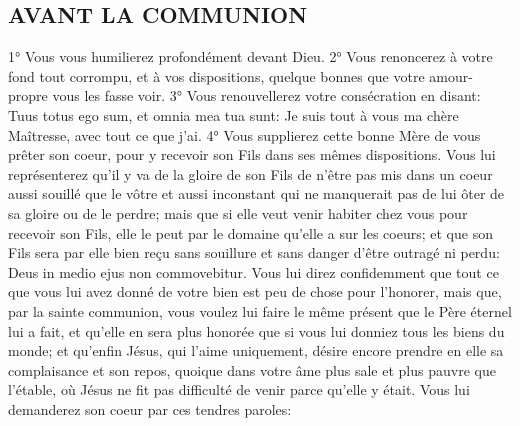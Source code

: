 \subsection{AVANT LA COMMUNION}
 1° Vous vous humilierez profondément devant Dieu. 2° Vous renoncerez à votre fond tout corrompu, et à vos
dispositions, quelque bonnes que votre amour-propre vous les fasse voir. 3° Vous renouvellerez votre
consécration en disant: Tuus totus ego sum, et omnia mea tua sunt: Je suis tout à vous ma chère Maîtresse, avec
tout ce que j'ai. 4° Vous supplierez cette bonne Mère de vous prêter son coeur, pour y recevoir son Fils dans ses
mêmes dispositions. Vous lui représenterez qu'il y va de la gloire de son Fils de n'être pas mis dans un coeur aussi
souillé que le vôtre et aussi inconstant qui ne manquerait pas de lui ôter de sa gloire ou de le perdre; mais que si
elle veut venir habiter chez vous pour recevoir son Fils, elle le peut par le domaine qu'elle a sur les coeurs; et que
son Fils sera par elle bien reçu sans souillure et sans danger d'être outragé ni perdu: Deus in medio ejus non
commovebitur. Vous lui direz confidemment que tout ce que vous lui avez donné de votre bien est peu de chose
pour l'honorer, mais que, par la sainte communion, vous voulez lui faire le même présent que le Père éternel lui a
fait, et qu'elle en sera plus honorée que si vous lui donniez tous les biens du monde; et qu'enfin Jésus, qui l'aime
uniquement, désire encore prendre en elle sa complaisance et son repos, quoique dans votre âme plus sale et
plus pauvre que l'étable, où Jésus ne fit pas difficulté de venir parce qu'elle y était. Vous lui demanderez son coeur
par ces tendres paroles: 

